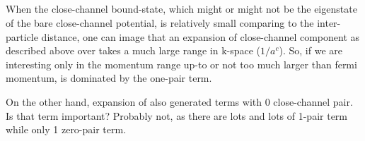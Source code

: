 \subsection{}
When the close-channel bound-state, which might or might not be the eigenstate of the bare close-channel potential, is relatively small comparing to the inter-particle distance, one can image that an expansion of close-channel component as described above over  takes a much large range in k-space ($1/a^{c}$).   So, if we are interesting only in the momentum range up-to or not too much larger than fermi momentum,  is dominated by the one-pair term.  

On the other hand, expansion of  also generated terms with 0 close-channel pair.  Is that term important? Probably not, as there are lots and lots of 1-pair term while only 1 zero-pair term.  